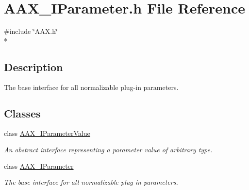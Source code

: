 \hypertarget{a00257}{}\section{A\+A\+X\+\_\+\+I\+Parameter.\+h File Reference}
\label{a00257}
{\ttfamily \#include \char`\"{}A\+A\+X.\+h\char`\"{}}\\*


\subsection{Description}
The base interface for all normalizable plug-\/in parameters. 

\subsection*{Classes}
\begin{DoxyCompactItemize}
\item 
class \hyperlink{a00109}{A\+A\+X\+\_\+\+I\+Parameter\+Value}
\begin{DoxyCompactList}\small\item\em An abstract interface representing a parameter value of arbitrary type. \end{DoxyCompactList}\item 
class \hyperlink{a00108}{A\+A\+X\+\_\+\+I\+Parameter}
\begin{DoxyCompactList}\small\item\em The base interface for all normalizable plug-\/in parameters. \end{DoxyCompactList}\end{DoxyCompactItemize}
